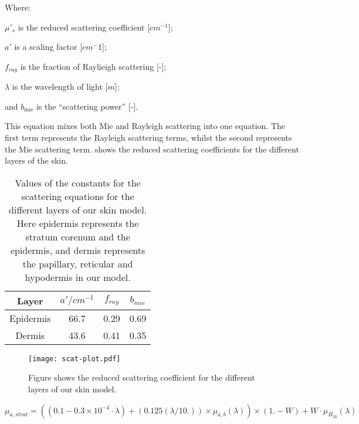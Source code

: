 \noindent Where:

	$\mu'_s$ is the reduced scattering coefficient [$cm^{-1}$];

	$a'$ is a scaling factor [$cm^-1$];

	$f_{ray}$ is the fraction of Raylieigh scattering [-];

	$\lambda$ is the wavelength of light [$m$];

	and $b_{\text{mie}}$ is the ``scattering power'' [-].

\medskip

This equation mixes both Mie and Rayleigh scattering into one equation.
The first term represents the Rayleigh scattering terms, whilst the second represents the Mie scattering term.
 shows the reduced scattering coefficients for the different layers of the skin.

\begin{table}[!htpb]
  \centering

  \begin{tabular}{|c|c|c|c|}
  \hline

  Layer & $a'/cm^{-1}$ & $f_{ray}$ & $b_{mie}$ \\
  \hline
   Epidermis         & 66.7 & 0.29 & 0.69 \\
   Dermis  & 43.6 & 0.41 & 0.35 \\

  \hline
  \end{tabular}
  \caption{Values of the constants for the scattering equations for the different layers of our skin model. Here epidermis represents the stratum corenum and the epidermis, and dermis represents the papillary, reticular and hypodermis in our model.}
  \label{tab:valscat}

\end{table}

\begin{figure}[!htpb]
	\centering
	\texttt{[image: scat-plot.pdf]}
	\caption{Figure shows the reduced scattering coefficient for the different layers of our skin model.}
	\label{fig:scatplot}
\end{figure}



\begin{equation}
\mu_{a,strat}= ((0.1 - 0.3\times10^{-4}\cdot\lambda) + (0.125(\lambda/10.))\times \mu_{a,b}(\lambda))\times(1. - W) + W\cdot\mu_{H_20}(\lambda)
\label{eqn:stratabs}
\end{equation}


